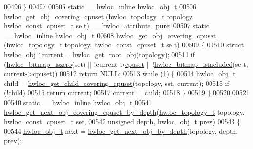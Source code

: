 \begin{DoxyCode}
00496 \}
00497 
00505 \textcolor{keyword}{static} \_\_hwloc\_inline \hyperlink{a00016}{hwloc_obj_t}
00506 \hyperlink{a00055_ga68300dd0ee9c36a7a90f275a59e9af28}{hwloc_get_obj_covering_cpuset} (\hyperlink{a00039_ga9d1e76ee15a7dee158b786c30b6a6e38}{hwloc_topology_t} topology, \hyperlink{a00040_ga1f784433e9b606261f62d1134f6a3b25}{hwloc_const_cpuset_t} \textcolor{keyword}{se
      t}) \_\_hwloc\_attribute\_pure;
00507 static \_\_hwloc\_inline \hyperlink{a00016}{hwloc_obj_t}
\hypertarget{a00031_source_l00508}{}\hyperlink{a00055_ga68300dd0ee9c36a7a90f275a59e9af28}{00508} \hyperlink{a00055_ga68300dd0ee9c36a7a90f275a59e9af28}{hwloc_get_obj_covering_cpuset} (\hyperlink{a00039_ga9d1e76ee15a7dee158b786c30b6a6e38}{hwloc_topology_t} topology, \hyperlink{a00040_ga1f784433e9b606261f62d1134f6a3b25}{hwloc_const_cpuset_t} se
      t)
00509 \{
00510   \textcolor{keyword}{struct }\hyperlink{a00016}{hwloc_obj} *current = \hyperlink{a00053_gadbf58f6e187efbdb3cd9a8e30311b7d7}{hwloc_get_root_obj}(topology);
00511   \textcolor{keywordflow}{if} (\hyperlink{a00065_gaa94fed35d2a598bc4a8657b6955b7bf5}{hwloc_bitmap_iszero}(\textcolor{keyword}{set}) || !current->\hyperlink{a00016_a67925e0f2c47f50408fbdb9bddd0790f}{cpuset} || !\hyperlink{a00065_gaae29e14a926c198e8f91e6e4790621e7}{hwloc_bitmap_isincluded}(\textcolor{keyword}{se
      t}, current->\hyperlink{a00016_a67925e0f2c47f50408fbdb9bddd0790f}{cpuset}))
00512     \textcolor{keywordflow}{return} NULL;
00513   \textcolor{keywordflow}{while} (1) \{
00514     \hyperlink{a00016}{hwloc_obj_t} child = \hyperlink{a00055_ga69a22cc76c88115aee7b7e6fc53fca7d}{hwloc_get_child_covering_cpuset}(topology, \textcolor{keyword}{set}, current);
00515     \textcolor{keywordflow}{if} (!child)
00516       \textcolor{keywordflow}{return} current;
00517     current = child;
00518   \}
00519 \}
00520 
00521 
00540 \textcolor{keyword}{static} \_\_hwloc\_inline \hyperlink{a00016}{hwloc_obj_t}
\hypertarget{a00031_source_l00541}{}\hyperlink{a00056_ga2f9a4ec15e9cfae8c21501257a51ce5b}{00541} \hyperlink{a00056_ga2f9a4ec15e9cfae8c21501257a51ce5b}{hwloc_get_next_obj_covering_cpuset_by_depth}(\hyperlink{a00039_ga9d1e76ee15a7dee158b786c30b6a6e38}{hwloc_topology_t} topology, 
      \hyperlink{a00040_ga1f784433e9b606261f62d1134f6a3b25}{hwloc_const_cpuset_t} \textcolor{keyword}{set},
00542                                             \textcolor{keywordtype}{unsigned} \hyperlink{a00016_a9d82690370275d42d652eccdea5d3ee5}{depth}, \hyperlink{a00016}{hwloc_obj_t} prev)
00543 \{
00544   \hyperlink{a00016}{hwloc_obj_t} next = \hyperlink{a00053_gab7c1dce3f42ece5bfa621e87cf332418}{hwloc_get_next_obj_by_depth}(topology, depth, prev);

\end{DoxyCode}

